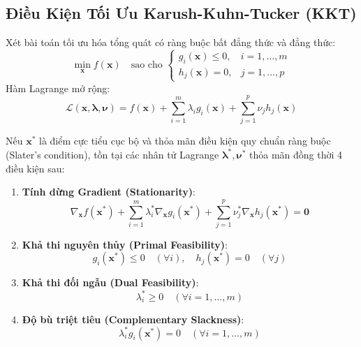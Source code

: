 \subsection{Điều Kiện Tối Ưu Karush-Kuhn-Tucker (KKT)}

Xét bài toán tối ưu hóa tổng quát có ràng buộc bất đẳng thức và đẳng thức:
\begin{equation}
\min_{\mathbf{x}} f(\mathbf{x}) \quad \text{sao cho } \begin{cases} g_i(\mathbf{x}) \le 0, & i = 1, \dots, m \\ h_j(\mathbf{x}) = 0, & j = 1, \dots, p \end{cases}
\end{equation}
Hàm Lagrange mở rộng:
\begin{equation}
\mathcal{L}(\mathbf{x}, \mathbf{\lambda}, \mathbf{\nu}) = f(\mathbf{x}) + \sum_{i=1}^m \lambda_i g_i(\mathbf{x}) + \sum_{j=1}^p \nu_j h_j(\mathbf{x})
\end{equation}

\begin{theorem}
Nếu $\mathbf{x}^*$ là điểm cực tiểu cục bộ và thỏa mãn điều kiện quy chuẩn ràng buộc (Slater's condition), tồn tại các nhân tử Lagrange $\mathbf{\lambda}^*, \mathbf{\nu}^*$ thỏa mãn đồng thời 4 điều kiện sau:
\begin{enumerate}
  \item \textbf{Tính dừng Gradient (Stationarity)}:
  \begin{equation}
  \nabla_{\mathbf{x}} f(\mathbf{x}^*) + \sum_{i=1}^m \lambda_i^* \nabla_{\mathbf{x}} g_i(\mathbf{x}^*) + \sum_{j=1}^p \nu_j^* \nabla_{\mathbf{x}} h_j(\mathbf{x}^*) = \mathbf{0}
  \end{equation}
  \item \textbf{Khả thi nguyên thủy (Primal Feasibility)}:
  \begin{equation}
  g_i(\mathbf{x}^*) \le 0 \quad (\forall i), \quad h_j(\mathbf{x}^*) = 0 \quad (\forall j)
  \end{equation}
  \item \textbf{Khả thi đối ngẫu (Dual Feasibility)}:
  \begin{equation}
  \lambda_i^* \ge 0 \quad (\forall i = 1, \dots, m)
  \end{equation}
  \item \textbf{Độ bù triệt tiêu (Complementary Slackness)}:
  \begin{equation}
  \lambda_i^* g_i(\mathbf{x}^*) = 0 \quad (\forall i = 1, \dots, m)
  \end{equation}
\end{enumerate}
\end{theorem}

